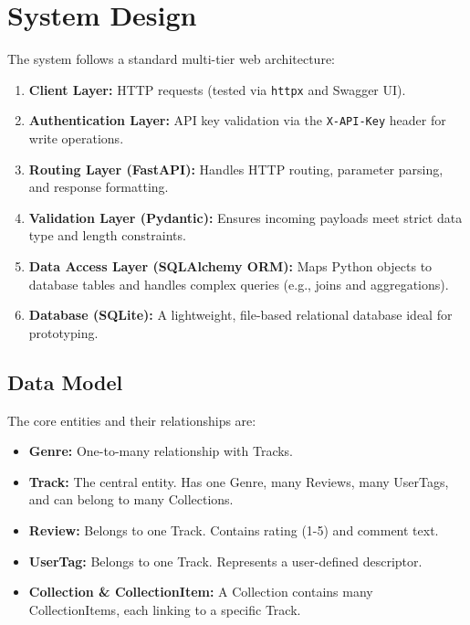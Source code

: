 \documentclass[11pt,a4paper]{article}
\begin{document}
\section{System Design}

The system follows a standard multi-tier web architecture:

\begin{enumerate}[label=\textbf{\textcolor{primary}{\arabic*.}}, noitemsep]
    \item \textbf{Client Layer:} HTTP requests (tested via \texttt{httpx} and Swagger UI).
    \item \textbf{Authentication Layer:} API key validation via the \texttt{X-API-Key} header for write operations.
    \item \textbf{Routing Layer (FastAPI):} Handles HTTP routing, parameter parsing, and response formatting.
    \item \textbf{Validation Layer (Pydantic):} Ensures incoming payloads meet strict data type and length constraints.
    \item \textbf{Data Access Layer (SQLAlchemy ORM):} Maps Python objects to database tables and handles complex queries (e.g., joins and aggregations).
    \item \textbf{Database (SQLite):} A lightweight, file-based relational database ideal for prototyping.
\end{enumerate}

\subsection{Data Model}
The core entities and their relationships are:
\begin{itemize}[label=\textcolor{primary}{\textbullet}, noitemsep]
    \item \textbf{Genre:} One-to-many relationship with Tracks.
    \item \textbf{Track:} The central entity. Has one Genre, many Reviews, many UserTags, and can belong to many Collections.
    \item \textbf{Review:} Belongs to one Track. Contains rating (1-5) and comment text.
    \item \textbf{UserTag:} Belongs to one Track. Represents a user-defined descriptor.
    \item \textbf{Collection \& CollectionItem:} A Collection contains many CollectionItems, each linking to a specific Track.
\end{itemize}
\end{document}
